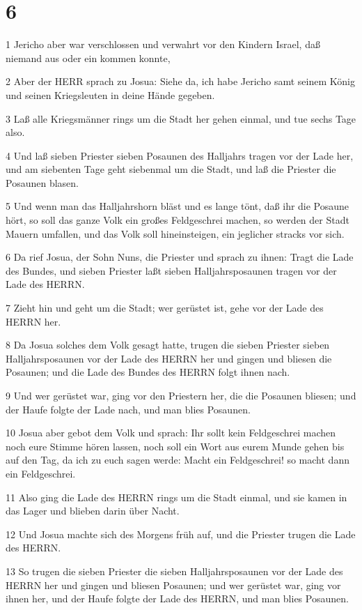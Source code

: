 \chapter{6}

\par 1 Jericho aber war verschlossen und verwahrt vor den Kindern Israel, daß niemand aus oder ein kommen konnte,
\par 2 Aber der HERR sprach zu Josua: Siehe da, ich habe Jericho samt seinem König und seinen Kriegsleuten in deine Hände gegeben.
\par 3 Laß alle Kriegsmänner rings um die Stadt her gehen einmal, und tue sechs Tage also.
\par 4 Und laß sieben Priester sieben Posaunen des Halljahrs tragen vor der Lade her, und am siebenten Tage geht siebenmal um die Stadt, und laß die Priester die Posaunen blasen.
\par 5 Und wenn man das Halljahrshorn bläst und es lange tönt, daß ihr die Posaune hört, so soll das ganze Volk ein großes Feldgeschrei machen, so werden der Stadt Mauern umfallen, und das Volk soll hineinsteigen, ein jeglicher stracks vor sich.
\par 6 Da rief Josua, der Sohn Nuns, die Priester und sprach zu ihnen: Tragt die Lade des Bundes, und sieben Priester laßt sieben Halljahrsposaunen tragen vor der Lade des HERRN.
\par 7 Zieht hin und geht um die Stadt; wer gerüstet ist, gehe vor der Lade des HERRN her.
\par 8 Da Josua solches dem Volk gesagt hatte, trugen die sieben Priester sieben Halljahrsposaunen vor der Lade des HERRN her und gingen und bliesen die Posaunen; und die Lade des Bundes des HERRN folgt ihnen nach.
\par 9 Und wer gerüstet war, ging vor den Priestern her, die die Posaunen bliesen; und der Haufe folgte der Lade nach, und man blies Posaunen.
\par 10 Josua aber gebot dem Volk und sprach: Ihr sollt kein Feldgeschrei machen noch eure Stimme hören lassen, noch soll ein Wort aus eurem Munde gehen bis auf den Tag, da ich zu euch sagen werde: Macht ein Feldgeschrei! so macht dann ein Feldgeschrei.
\par 11 Also ging die Lade des HERRN rings um die Stadt einmal, und sie kamen in das Lager und blieben darin über Nacht.
\par 12 Und Josua machte sich des Morgens früh auf, und die Priester trugen die Lade des HERRN.
\par 13 So trugen die sieben Priester die sieben Halljahrsposaunen vor der Lade des HERRN her und gingen und bliesen Posaunen; und wer gerüstet war, ging vor ihnen her, und der Haufe folgte der Lade des HERRN, und man blies Posaunen.
